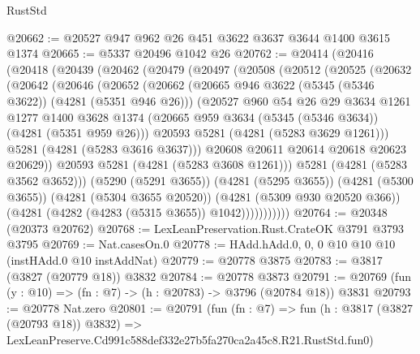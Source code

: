 \begin{lexlean}{RustStd}
\begin{coremodule}
@20662 := @20527 @947 @962 @26 @451 @3622 @3637 @3644 @1400 @3615 @1374
@20665 := @5337 @20496 @1042 @26
@20762 := @20414
    (@20416
      (@20418
        (@20439
          (@20462
            (@20479
              (@20497
                (@20508
                  (@20512
                    (@20525
                      (@20632
                        (@20642
                          (@20646
                            (@20652
                              (@20662
                                (@20665 @946 @3622 (@5345 (@5346 @3622)) (@4281 (@5351 @946 @26)))
                                (@20527
                                  @960
                                  @54
                                  @26
                                  @29
                                  @3634
                                  @1261
                                  @1277
                                  @1400
                                  @3628
                                  @1374
                                  (@20665 @959 @3634 (@5345 (@5346 @3634)) (@4281 (@5351 @959 @26)))
                                  @20593
                                  @5281
                                  (@4281 (@5283 @3629 @1261)))
                                @5281
                                (@4281 (@5283 @3616 @3637)))
                              @20608
                              @20611
                              @20614
                              @20618
                              @20623
                              @20629))
                          @20593
                          @5281
                          (@4281 (@5283 @3608 @1261)))
                        @5281
                        (@4281 (@5283 @3562 @3652)))
                      (@5290 (@5291 @3655))
                      (@4281 (@5295 @3655))
                      (@4281 (@5300 @3655))
                      (@4281 (@5304 @3655 @20520))
                      (@4281 (@5309 @930 @20520 @366))
                      (@4281 (@4282 (@4283 (@5315 @3655)) @1042)))))))))))
@20764 := @20348 (@20373 @20762)
@20768 := LexLeanPreservation.Rust.CrateOK @3791 @3793 @3795
@20769 := Nat.casesOn.{0}
@20778 := HAdd.hAdd.{0, 0, 0} @10 @10 @10 (instHAdd.{0} @10 instAddNat)
@20779 := @20778 @3875
@20783 := @3817 (@3827 (@20779 @18)) @3832
@20784 := @20778 @3873
@20791 := @20769 (fun (y : @10) => (fn : @7) -> (h : @20783) -> @3796 (@20784 @18)) @3831
@20793 := @20778 Nat.zero
@20801 := @20791
    (fun (fn : @7) =>
    fun (h : @3817 (@3827 (@20793 @18)) @3832) =>
    LexLeanPreserve.Cd991c588def332e27b5fa270ca2a45c8.R21.RustStd.fun0)

\end{coremodule}
\end{lexlean}
